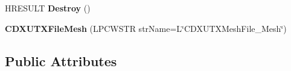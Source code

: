 \begin{DoxyCompactItemize}
\item 
\hypertarget{class_c_d_x_u_t_x_file_mesh_ae1e8c51bc4040ece2b67bb1140080f49}{H\+R\+E\+S\+U\+L\+T {\bfseries Destroy} ()}\label{class_c_d_x_u_t_x_file_mesh_ae1e8c51bc4040ece2b67bb1140080f49}

\item 
\hypertarget{class_c_d_x_u_t_x_file_mesh_a601dd44242366265fd43b85ee729d4d5}{{\bfseries C\+D\+X\+U\+T\+X\+File\+Mesh} (L\+P\+C\+W\+S\+T\+R str\+Name=L\char`\"{}C\+D\+X\+U\+T\+X\+Mesh\+File\+\_\+\+Mesh\char`\"{})}\label{class_c_d_x_u_t_x_file_mesh_a601dd44242366265fd43b85ee729d4d5}

\end{DoxyCompactItemize}
\subsection*{Public Attributes}
